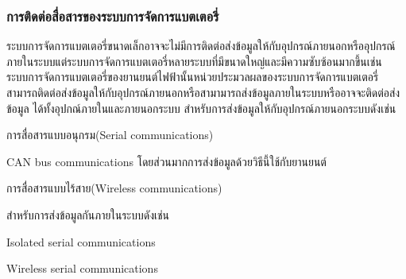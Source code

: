 \subsubsection*{การติดต่อสื่อสารของระบบการจัดการแบตเตอรี่}
ระบบการจัดการแบตเตอรี่ขนาดเล็กอาจจะไม่มีการติดต่อส่งข้อมูลให้กับอุปกรณ์ภายนอกหรืออุปกรณ์ภายในระบบแต่ระบบการจัดการแบตเตอรี่หลายระบบที่มีขนาดใหญ่และมีความซับซ้อนมากขึ้นเช่น
ระบบการจัดการแบตเตอรี่ของยานยนต์ไฟฟ้านั้นหน่วยประมวลผลของระบบการจัดการแบตเตอรี่สามารถติดต่อส่งข้อมูลให้กับอุปกรณ์ภายนอกหรือสามามารถส่งข้อมูลภายในระบบหรืออาจจะติดต่อส่งข้อมูล
ได้ทั้งอุปกณ์ภายในและภายนอกระบบ\newline\hspace*{2cm}
สำหรับการส่งข้อมูลให้กับอุปกรณ์ภายนอกระบบดังเช่น
\begin{itemize}
	{\item 	การสื่อสารแบบอนุกรม(Serial communications)}
	{\item 	CAN bus communications โดยส่วนมากการส่งข้อมูลด้วยวิธีนี้ใช้กับยานยนต์}
	{\item 	การสื่อสารแบบไร้สาย(Wireless communications)}
\end{itemize}
สำหรับการส่งข้อมูลกันภายในระบบดังเช่น
\begin{itemize}
	{\item 	Isolated serial communications}
	{\item 	Wireless serial communications}
\end{itemize}
































